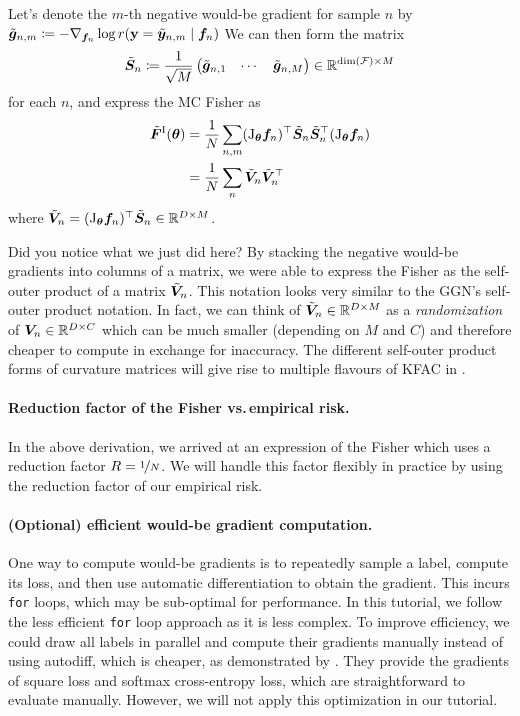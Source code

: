 Let's denote the $m$-th negative would-be gradient for sample $n$ by $\tilde{{\bm{g}}}_{n,m} \coloneq -\nabla_{{\bm{f}}_n} \log r({\mathbf{y}} = \tilde{{\bm{y}}}_{n,m} \mid {\bm{f}}_n)$
We can then form the matrix
\begin{align*}
  \tilde{{\bm{S}}}_n
  \coloneq
  \frac{1}{\sqrt{M}}
  \begin{pmatrix}
    \tilde{{\bm{g}}}_{n,1} & \cdots & \tilde{{\bm{g}}}_{n,M}
  \end{pmatrix}
  \in {\mathbb{R}}^{\dim({\mathcal{F}}) \times M}
\end{align*}
for each $n$, and express the MC Fisher as
\begin{align*}
  \tilde{{\bm{F}}}^{\text{I}}({\bm{\theta}})
  & =
    \frac{1}{N} \sum_{n,m}
    (\mathrm{J}_{{\bm{\theta}}}{\bm{f}}_n)^{\top}
    \tilde{{\bm{S}}}_n
    \tilde{{\bm{S}}}_n^{\top}
    (\mathrm{J}_{{\bm{\theta}}}{\bm{f}}_n)
  \\
  & =
    \frac{1}{N} \sum_n
    \tilde{{\bm{V}}}_n
    \tilde{{\bm{V}}}_n^{\top}
\end{align*}
where $\tilde{{\bm{V}}}_n = (\mathrm{J}_{{\bm{\theta}}}{\bm{f}}_n)^{\top} \tilde{{\bm{S}}}_n \in {\mathbb{R}}^{D \times M}$.

Did you notice what we just did here?
By stacking the negative would-be gradients into columns of a matrix, we were able to express the Fisher as the self-outer product of a matrix $\tilde{{\bm{V}}}_n$.
This notation looks very similar to the GGN's self-outer product notation.
In fact, we can think of $\tilde{{\bm{V}}}_n \in {\mathbb{R}}^{D \times M}$ as a \emph{randomization} of ${\bm{V}}_n \in {\mathbb{R}}^{D \times C}$ which can be much smaller (depending on $M$ and $C$) and therefore cheaper to compute in exchange for inaccuracy.
The different self-outer product forms of curvature matrices will give rise to multiple flavours of KFAC in .

\paragraph{Reduction factor of the Fisher vs.\,empirical risk.}
In the above derivation, we arrived at an expression of the Fisher which uses a reduction factor $R = \nicefrac{1}{N}$.
We will handle this factor flexibly in practice by using the reduction factor of our empirical risk.

\paragraph{(Optional) efficient would-be gradient computation.}
One way to compute would-be gradients is to repeatedly sample a label, compute its loss, and then use automatic differentiation to obtain the gradient.
This incurs \texttt{for} loops, which may be sub-optimal for performance.
In this tutorial, we follow the less efficient \texttt{for} loop approach as it is less complex.
To improve efficiency, we could draw all labels in parallel and compute their gradients manually instead of using autodiff, which is cheaper, as demonstrated by .
They provide the gradients of square loss and softmax cross-entropy loss, which are straightforward to evaluate manually.
However, we will not apply this optimization in our tutorial.

